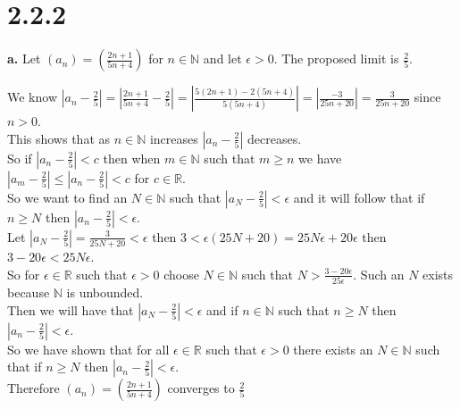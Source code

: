 \documentclass{article}
\begin{document}
\newpage
\section*{2.2.2}

{\Large \textbf{a.}} Let $(a_n) = (\frac{2n+1}{5n+4})$ for $n\in\mathbb{N}$ and let $\epsilon > 0$. The proposed limit is $\frac{2}{5}$.
\begin{center}
    \doublespacing
    We know {\large $|a_n - \frac{2}{5}| = |\frac{2n+1}{5n+4} -\frac{2}{5}| = |\frac{5(2n+1) - 2(5n+4)}{5(5n+4)}| = |\frac{-3}{25n+20}| =\frac{3}{25n+20}$} since $n > 0$.
    \\This shows that as $n\in\mathbb{N}$ increases $|a_n -\frac{2}{5}|$ decreases.
    \\So if $|a_n -\frac{2}{5}| < c$ then when $m\in\mathbb{N}$ such that $m\geq n$ we have $|a_m -\frac{2}{5}|\leq |a_n -\frac{2}{5}| < c$ for $c\in\mathbb{R}$.
    \\So we want to find an $N\in\mathbb{N}$ such that $|a_N -\frac{2}{5}| <\epsilon$ and it will follow that if $n\geq N$ then $|a_n -\frac{2}{5}| <\epsilon$.
    \\Let $|a_N -\frac{2}{5}| =\frac{3}{25N+20} <\epsilon$ then $3 <\epsilon (25N + 20) = 25N\epsilon + 20\epsilon$ then $3 - 20\epsilon < 25N\epsilon$.
    \\So for $\epsilon\in\mathbb{R}$ such that $\epsilon > 0$ choose $N\in\mathbb{N}$ such that {\large $N >\frac{3-20\epsilon}{25\epsilon}$}. Such an $N$ exists because $\mathbb{N}$ is unbounded.
    \\Then we will have that $|a_N -\frac{2}{5}| <\epsilon$ and if $n\in\mathbb{N}$ such that $n\geq N$ then $|a_n -\frac{2}{5}| <\epsilon$.
    \\So we have shown that for all $\epsilon\in\mathbb{R}$ such that $\epsilon > 0$ there exists an $N\in\mathbb{N}$ such that if $n\geq N$ then $|a_n -\frac{2}{5}| <\epsilon$.
    \\Therefore $(a_n) = (\frac{2n+1}{5n+4})$ converges to $\frac{2}{5}$ \qedsymbol
\end{center}
\end{document}
